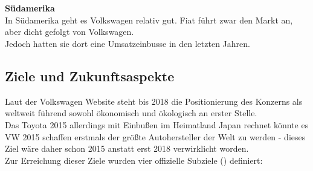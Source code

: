 \documentclass[12pt]{article}
\begin{document}
\noindent
\\\\
\textbf{Südamerika}\\
In Südamerika geht es Volkswagen relativ gut. Fiat führt zwar den Markt an, aber dicht gefolgt von Volkswagen. \\
Jedoch hatten sie dort eine Umsatzeinbusse in den letzten Jahren.







\subsection{Ziele und Zukunftsaspekte}
Laut der Volkswagen Website steht bis 2018 die Positionierung des Konzerns als weltweit führend sowohl ökonomisch und ökologisch an erster Stelle.\\ Das Toyota 2015 allerdings mit Einbußen im Heimatland Japan rechnet könnte es VW 2015 schaffen erstmals der größte Autohersteller der Welt zu werden - dieses Ziel wäre daher schon 2015 anstatt erst 2018 verwirklicht worden.\\
Zur Erreichung dieser Ziele wurden vier offizielle Subziele (\cite{vwwebsitestrat}) definiert:
\end{document}
